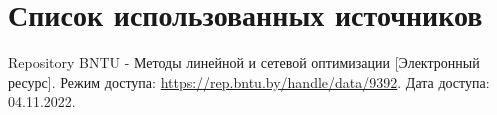\newpage

\begingroup
  \section*{Список использованных источников}

  \renewcommand{\addcontentsline}[3]{}%
  \renewcommand{\section}[2]{}%

  \begin{thebibliography}{}
    Repository BNTU - Методы линейной и сетевой оптимизации
    [Электронный ресурс].
    Режим доступа: \url{https://rep.bntu.by/handle/data/9392}.
    Дата доступа: 04.11.2022.
  \end{thebibliography}
\endgroup


\begingroup
  \section*{Литература, чтобы писать в \LaTeX}
  \addcontentsline{toc}{section}{Литература, чтобы писать в LaTeX}

  \renewcommand{\addcontentsline}[3]{}%
  \renewcommand{\section}[2]{}%

